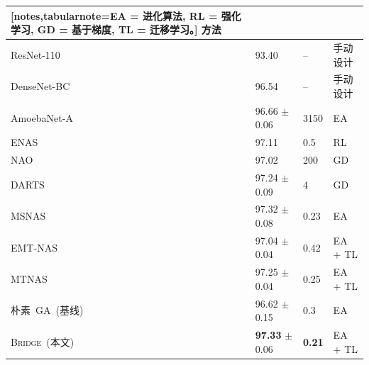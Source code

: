 \documentclass[../main.tex]{subfiles}
\begin{document}
\begin{table}
\begin{NiceTabularX}{\textwidth}{p{9em}X[c]X[c]l}[notes,tabularnote={EA = 进化算法, RL = 强化学习, GD = 基于梯度, TL = 迁移学习。}]
		\toprule
		方法                                             &  &  &  \\
		\midrule\midrule
		ResNet-110~\cite{deepresiduallearning_he_2016}         & 93.40                        & --                             & 手动设计              \\
		DenseNet-BC~\cite{denselyconnectedconvolutional_huang_2017}     & 96.54                        & --                             & 手动设计              \\
		\midrule
		AmoebaNet-A~\cite{regularizedevolutionimage_real_2019}      & 96.66 \(\pm\) 0.06           & 3150                           & EA                    \\
		ENAS~\cite{efficientneuralarchitecture_pham_2018}                  & 97.11                        & 0.5                            & RL                    \\
		NAO~\cite{neuralarchitectureoptimization_luo_2018}              & 97.02                        & 200                            & GD                    \\
		DARTS~\cite{dartsdifferentiablearchitecture_liu_2019}              & 97.24 \(\pm\) 0.09           & 4                              & GD                    \\
		MSNAS~\cite{cellbasedfast_dong_2023}       & 97.32 \(\pm\) 0.08           & 0.23                           & EA                    \\
		\midrule
		EMT-NAS~\cite{emtnastransferring_liao_2023}           & 97.04 \(\pm\) 0.04           & 0.42                           & EA + TL               \\
		MTNAS~\cite{evolutionarymultitaskconvolutional_zhou_2024}       & 97.25 \(\pm\) 0.04           & 0.25                           & EA + TL               \\
		\midrule
		朴素~GA~(基线)                                   & 96.62 \(\pm\) 0.15           & 0.3                            & EA                    \\
		\textsc{Bridge}~(本文)                           & \textbf{97.33} \(\pm\) 0.06  & \bfseries 0.21                 & EA + TL               \\
		\bottomrule
	\end{NiceTabularX}
\end{table}

\label{sec:ch4-9-in-depth-analysis}
\end{document}
